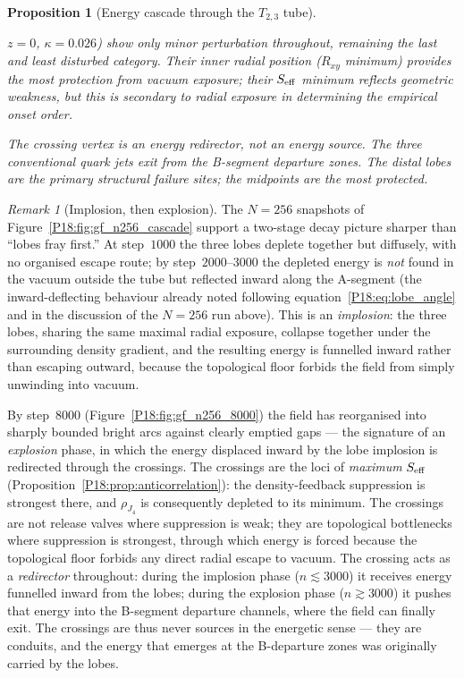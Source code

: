 \documentclass[11pt,a4paper]{article}
\newtheorem{proposition}[theorem]{Proposition}
\theoremstyle{definition}\newtheorem{definition}[theorem]{Definition}
\theoremstyle{remark}
\newtheorem{remark}[theorem]{Remark}
\begin{document}
\begin{proposition}[Energy cascade through the $T_{2,3}$ tube]
\begin{enumerate}[noitemsep,label=(\roman*)]
  $z=0$, $\kappa=0.026$) show only minor perturbation throughout,
  remaining the last and least disturbed category.  Their inner
  radial position ($R_{xy}$ minimum) provides the most protection
  from vacuum exposure; their $S_{\rm eff}$ minimum reflects
  geometric weakness, but this is secondary to radial exposure in
  determining the empirical onset order.
\end{enumerate}
The crossing vertex is an energy \emph{redirector}, not an energy
\emph{source}.  The three conventional quark jets exit from the
B-segment departure zones.  The distal lobes are the primary
structural failure sites; the midpoints are the most protected.
\end{proposition}

\begin{remark}[Implosion, then explosion]
\label{P18:rem:implode_explode}
The $N=256$ snapshots of Figure~\ref{P18:fig:gf_n256_cascade} support a
two-stage decay picture sharper than ``lobes fray first.''  At
step~$1000$ the three lobes deplete together but diffusely, with no
organised escape route; by step~$2000$--$3000$ the depleted energy is
\emph{not} found in the vacuum outside the tube but reflected inward
along the A-segment (the inward-deflecting behaviour already noted
following equation~\eqref{P18:eq:lobe_angle} and in the discussion of the
$N=256$ run above).  This is an \emph{implosion}: the three lobes,
sharing the same maximal radial exposure, collapse together under the
surrounding density gradient, and the resulting energy is funnelled
inward rather than escaping outward, because the topological floor
forbids the field from simply unwinding into vacuum.

By step~$8000$ (Figure~\ref{P18:fig:gf_n256_8000}) the field has
reorganised into sharply bounded bright arcs against clearly emptied
gaps --- the signature of an \emph{explosion} phase, in which the
energy displaced inward by the lobe implosion is redirected through
the crossings.  The crossings are the loci of \emph{maximum}
$S_{\rm eff}$ (Proposition~\ref{P18:prop:anticorrelation}): the
density-feedback suppression is strongest there, and $\rho_{J_4}$
is consequently depleted to its minimum.  The crossings are not
release valves where suppression is weak; they are topological
bottlenecks where suppression is strongest, through which energy
is forced because the topological floor forbids any direct
radial escape to vacuum.  The crossing acts as a
\emph{redirector} throughout: during the implosion phase
($n\lesssim3000$) it receives energy funnelled inward from the
lobes; during the explosion phase ($n\gtrsim3000$) it pushes that
energy into the B-segment departure channels, where the field can
finally exit.  The crossings are thus never sources in the
energetic sense --- they are conduits, and the energy that
emerges at the B-departure zones was originally carried by the
lobes.


\end{remark}
\end{document}
